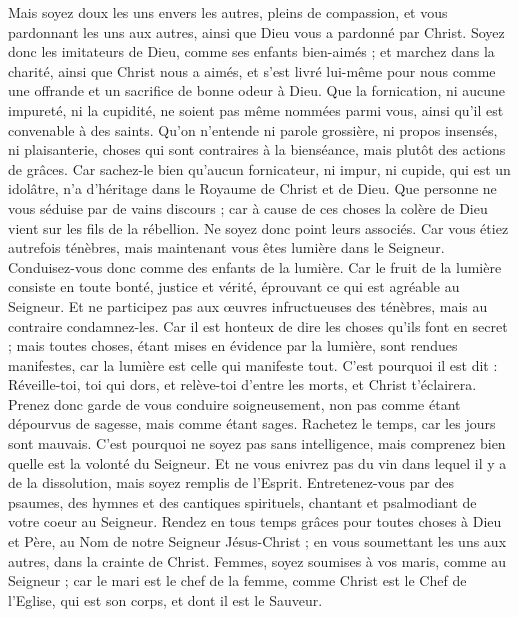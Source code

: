 \begin{multicols}{2}
Mais soyez doux les uns envers les autres, pleins de compassion, et vous pardonnant les uns aux autres, ainsi que Dieu vous a pardonné par Christ.
\VerseOne{}Soyez donc les imitateurs de Dieu, comme ses enfants bien-aimés ;
et marchez dans la charité, ainsi que Christ nous a aimés, et s'est livré lui-même pour nous comme une offrande et un sacrifice de bonne odeur à Dieu.
Que la fornication, ni aucune impureté, ni la cupidité, ne soient pas même nommées parmi vous, ainsi qu'il est convenable à des saints.
Qu'on n'entende ni parole grossière, ni propos insensés, ni plaisanterie, choses qui sont contraires à la bienséance, mais plutôt des actions de grâces.
Car sachez-le bien qu'aucun fornicateur, ni impur, ni cupide, qui est un idolâtre, n'a d'héritage dans le Royaume de Christ et de Dieu.
Que personne ne vous séduise par de vains discours ; car à cause de ces choses la colère de Dieu vient sur les fils de la rébellion.
Ne soyez donc point leurs associés.
Car vous étiez autrefois ténèbres, mais maintenant vous êtes lumière dans le Seigneur. Conduisez-vous donc comme des enfants de la lumière.
Car le fruit de la lumière consiste en toute bonté, justice et vérité,
éprouvant ce qui est agréable au Seigneur.
Et ne participez pas aux œuvres infructueuses des ténèbres, mais au contraire condamnez-les.
Car il est honteux de dire les choses qu'ils font en secret ;
mais toutes choses, étant mises en évidence par la lumière, sont rendues manifestes, car la lumière est celle qui manifeste tout.
C'est pourquoi il est dit : Réveille-toi, toi qui dors, et relève-toi d'entre les morts, et Christ t'éclairera.
Prenez donc garde de vous conduire soigneusement, non pas comme étant dépourvus de sagesse, mais comme étant sages.
Rachetez le temps, car les jours sont mauvais.
C'est pourquoi ne soyez pas sans intelligence, mais comprenez bien quelle est la volonté du Seigneur.
Et ne vous enivrez pas du vin dans lequel il y a de la dissolution, mais soyez remplis de l'Esprit.
Entretenez-vous par des psaumes, des hymnes et des cantiques spirituels, chantant et psalmodiant de votre coeur au Seigneur.
Rendez en tous temps grâces pour toutes choses à Dieu et Père, au Nom de notre Seigneur Jésus-Christ ;
en vous soumettant les uns aux autres, dans la crainte de Christ.
Femmes, soyez soumises à vos maris, comme au Seigneur ;
car le mari est le chef de la femme, comme Christ est le Chef de l'Eglise, qui est son corps, et dont il est le Sauveur.

\end{multicols}
